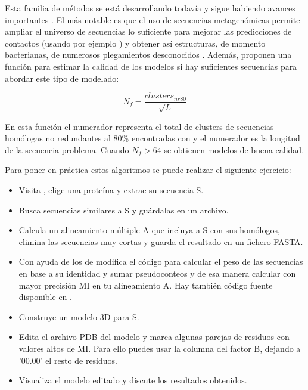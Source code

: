 Esta familia de m\'{e}todos  se est\'{a} desarrollando todav\'{i}a y sigue habiendo avances importantes \citep{Buchan2017}.
El m\'{a}s notable es que el uso de secuencias metagen\'{o}micas permite ampliar el universo de secuencias lo suficiente 
para mejorar las predicciones de contactos (usando por ejemplo ) 
y obtener as\'{i} estructuras, de momento bacterianas, de numerosos plegamientos desconocidos \citep{Ovchinnikov2017}. 
Adem\'{a}s, \citet{Ovchinnikov2017} proponen una funci\'{o}n para estimar la calidad de los modelos si hay suficientes secuencias para abordar
este tipo de modelado:

\begin{equation}
N_{f} = \frac{clusters_{nr80}}{\sqrt L} 
\end{equation} 

En esta funci\'{o}n el numerador representa el total de clusters de secuencias hom\'{o}logas no redundantes al 80\% 
encontradas con  y el numerador es la longitud de la secuencia problema. 
Cuando $N_{f} > 64$ se obtienen modelos de buena calidad. 
 
Para poner en pr\'{a}ctica estos algoritmos se puede realizar el siguiente ejercicio:

\begin{itemize}

\item Visita , elige una prote\'{i}na y extrae su secuencia S.

\item Busca secuencias similares a S y gu\'{a}rdalas en un archivo.

\item Calcula un alineamiento m\'{u}ltiple A que incluya a S con sus hom\'{o}logos, elimina las secuencias muy cortas y 
guarda el resultado en un fichero FASTA.

\item Con ayuda de los 
 de \cite{Marks2011}
modifica el c\'{o}digo 
para calcular el peso de las secuencias en base a su identidad
y sumar pseudoconteos y de esa manera calcular con mayor precisi\'{o}n MI en tu alineamiento A.
Hay tambi\'{e}n c\'{o}digo fuente disponible en 
.

\item Construye un modelo 3D para S.

\item Edita el archivo PDB del modelo y marca algunas parejas de residuos con valores altos de MI. Para ello puedes usar la columna del factor B,
dejando a '00.00' el resto de residuos. 

\item Visualiza el modelo editado y discute los resultados obtenidos.

\end{itemize}

